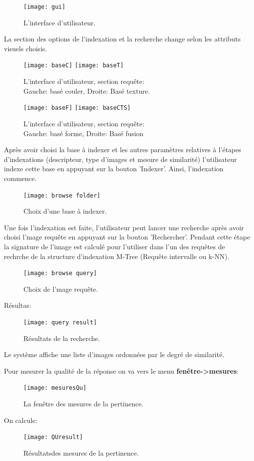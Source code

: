 \begin{figure}[H]
	\centering
	\texttt{[image: gui]} 
	\caption{L'interface d’utilisateur.}
\end{figure}

La section des options de l'indexation et la recherche change selon les attributs visuels choisis.

\begin{figure}[H]
	\centering
	\texttt{[image: baseC]} \space
	\texttt{[image: baseT]} 
	\caption{L'interface d’utilisateur, section requête: \\
	Gauche: basé couler, Droite: Basé texture.}
\end{figure}
\begin{figure}[H]
	\centering
	\texttt{[image: baseF]} \space
	\texttt{[image: baseCTS]} 
	\caption{L'interface d’utilisateur, section requête: \\
		Gauche: basé forme, Droite: Basé fusion}
\end{figure}


Après avoir choisi la base à indexer et les autres paramètres relatives à l'étapes d'indexations (descripteur, type d'images et mesure de similarité) l’utilisateur indexe cette base en appuyant sur la bouton 'Indexer'. Ainsi, l'indexation commence. \\

\begin{figure}[H]
	\centering
	\texttt{[image: browse folder]} 
	\caption{Choix d'une base à indexer.}
\end{figure}

Une fois l'indexation est faite, l’utilisateur peut lancer une recherche après avoir choisi l'mage requête en appuyant sur la bouton 'Rechercher'. Pendant cette étape la signature de l’image est calculé pour l'utiliser dans l'un des requêtes de rechrche de la structure d'indexation M-Tree (Requête intervalle ou k-NN).\\

\begin{figure}[H]
	\centering
	\texttt{[image: browse query]} 
	\caption{Choix de l'mage requête.}
\end{figure}
Résultas:
\begin{figure}[H]
	\centering
	\texttt{[image: query result]} 
	\caption{Résultats de la recherche.}
\end{figure}

Le système affiche une liste d'images ordonnées par le degré de similarité.

Pour mesurer la qualité de la réponse on va vers le menu \textbf{fenêtre->mesures}:
\begin{figure}[H]
	\centering
	\texttt{[image: mesuresQu]} 
	\caption{La fenêtre des mesures de la pertinence.}
\end{figure}
On calcule:
\begin{figure}[H]
	\centering
	\texttt{[image: QUresult]} 
	\caption{Résultatsdes mesures de la pertinence.}
\end{figure}

